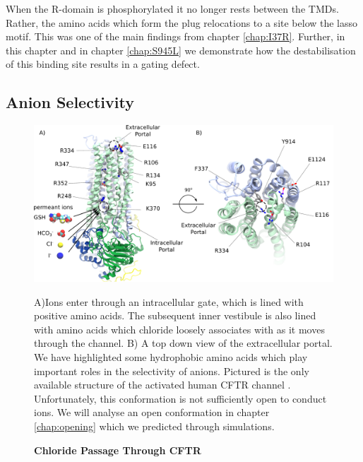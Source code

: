 When the R-domain is phosphorylated it no longer rests between the TMDs. Rather, the amino acids which form the plug relocations to a site below the lasso motif. This was one of the main findings from chapter \ref{chap:I37R}. Further, in this chapter and in chapter \ref{chap:S945L} we demonstrate how the destabilisation of this binding site results in a gating defect.  



\subsection {Anion Selectivity}

\begin{figure}
	\begin{center}
	\includegraphics[width=\textwidth]{figures/chloride_passage_figure.pdf}
	\end{center}
	\captionsetup{singlelinecheck = false, justification=raggedright}
	\caption[Chloride Passage through CFTR] {\textbf{Chloride Passage Through CFTR}}{A)Ions enter through an intracellular gate, which is lined with positive amino acids. The subsequent inner vestibule is also lined with amino acids which chloride loosely associates with as it moves through the channel. B) A top down view of the extracellular portal. We have highlighted some hydrophobic amino acids which play important roles in the selectivity of anions. Pictured is the only available structure of the activated human CFTR channel \cite{zhang2018}. Unfortunately, this conformation is not sufficiently open to conduct ions. We will analyse an open conformation in chapter \ref{chap:opening} which we predicted through simulations.} 
	\label{chloride_passage}

\end{figure}

